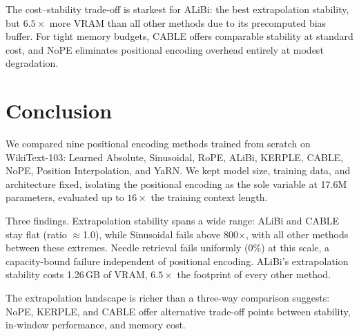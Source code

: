 \documentclass[conference]{IEEEtran}
\begin{document}
The cost--stability trade-off is starkest for ALiBi: the best extrapolation stability, but $6.5\times$ more VRAM than all other methods due to its precomputed bias buffer. For tight memory budgets, CABLE offers comparable stability at standard cost, and NoPE eliminates positional encoding overhead entirely at modest degradation.

\section{Conclusion}
\label{sec:conclusion}

We compared nine positional encoding methods trained from scratch on WikiText-103: Learned Absolute, Sinusoidal, RoPE, ALiBi, KERPLE, CABLE, NoPE, Position Interpolation, and YaRN. We kept model size, training data, and architecture fixed, isolating the positional encoding as the sole variable at 17.6M parameters, evaluated up to $16\times$ the training context length.

Three findings. Extrapolation stability spans a wide range: ALiBi and CABLE stay flat (ratio $\approx$1.0), while Sinusoidal fails above 800$\times$, with all other methods between these extremes. Needle retrieval fails uniformly (0\%) at this scale, a capacity-bound failure independent of positional encoding. ALiBi's extrapolation stability costs 1.26\,GB of VRAM, $6.5\times$ the footprint of every other method.

The extrapolation landscape is richer than a three-way comparison suggests: NoPE, KERPLE, and CABLE offer alternative trade-off points between stability, in-window performance, and memory cost.
\end{document}
